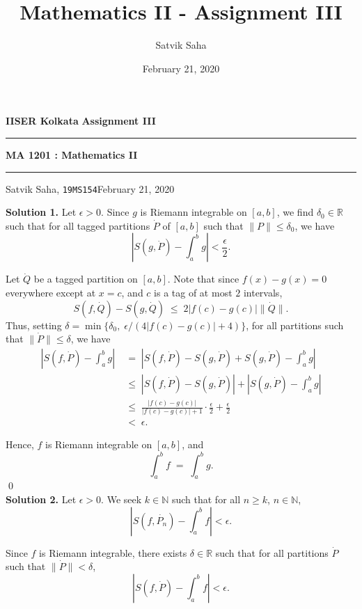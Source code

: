 \documentclass[10pt]{article}
\title{Mathematics II - Assignment III}
\author{Satvik Saha}
\date{February 21, 2020}
\begin{document}
        \par\textbf{IISER Kolkata} \hfill \textbf{Assignment III}
        \vspace{3pt}
        \hrule
        \vspace{3pt}
        \begin{center}
                \LARGE{\textbf{MA 1201 : Mathematics II}}
        \end{center}
        \vspace{3pt}
        \hrule
        \vspace{3pt}
        Satvik Saha, \texttt{19MS154}\hfill February 21, 2020
        \vspace{20pt}

        \textbf{Solution 1.}
        Let $\epsilon > 0$. Since $g$ is Riemann integrable on $[a, b]$, we find $\delta_0 \in \mathbb{R}$ such that for all tagged partitions $\dot{P}$ of 
        $[a, b]$ such that $ \| P  \| \le \delta_0$, we have
        \[| S(g, \dot{P}) - \int_a^b g | < \frac{\epsilon}2.\]
        
        Let $\dot{Q}$ be a tagged partition on $[a, b]$. Note that since $f(x) - g(x) = 0$ everywhere except at $x = c$,
        and $c$ is a tag of at most $2$ intervals,
        \[S(f, \dot{Q}) - S(g, \dot{Q}) \;\le\; 2|f(c) - g(c)|\|\dot{Q}\|.\]
        Thus, setting $\delta = \min \{ \delta_0, \;\epsilon / (4|f(c) - g(c)| + 4)\} $, for all partitions such that $\|\dot{P}\| \le \delta$, we have
        \begin{align*}
        |S(f, \dot{P}) - \int_a^b g| 
        \;&=\;   |S(f, \dot{P}) - S(g, \dot{P}) + S(g, \dot{P}) - \int_a^b g| \\
        \;&\le\; |S(f, \dot{P}) - S(g, \dot{P})| + |S(g, \dot{P}) - \int_a^b g| \\
        \;&\le\; \frac{|f(c) - g(c)|}{|f(c) - g(c)| + 1}\cdot\frac{\epsilon}2 + \frac{\epsilon}2 \\
        \;&<\; \epsilon.
        \end{align*}

        Hence, $f$ is Riemann integrable on $[a, b]$, and
        \[\int_a^b f \;=\; \int_a^b g.\] \qed\\

        \textbf{Solution 2.}
        Let $\epsilon > 0$. We seek $k \in \mathbb{N}$ such that for all $n \ge k$, $n \in \mathbb{N}$,
        \[ |S(f, \dot{P_n}) - \int_a^b f| < \epsilon.\]

        Since $f$ is Riemann integrable, there exists $\delta \in \mathbb{R}$ such that for all partitions $\dot{P}$ such that $\|\dot{P}\| < \delta$,
        \[|S(f, \dot{P}) - \int_a^b f| < \epsilon.\]
\end{document}

